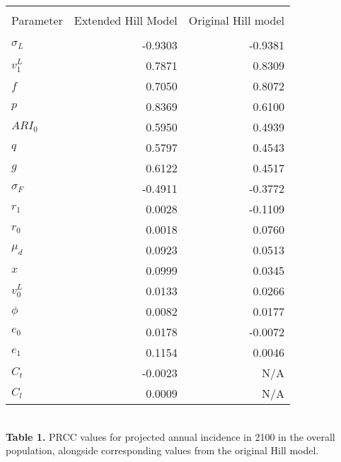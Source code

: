 \documentclass{article}[11pt]
\begin{document}
\begin{table}
\centering
\begin{tabular}{l r r}
\hline\hline\\
Parameter & Extended Hill Model & Original Hill model \\ [0.5ex]
\hline\\
$\sigma_{L}$  & -0.9303 & -0.9381 \\
$v^{L}_{1}$   & 0.7871  & 0.8309 \\
$f$                 & 0.7050  & 0.8072 \\
$p$                & 0.8369  & 0.6100 \\
$ARI_{0}$      & 0.5950  & 0.4939 \\
$q$                & 0.5797  & 0.4543 \\
$g$                & 0.6122  & 0.4517 \\
$\sigma_{F}$ & -0.4911 & -0.3772 \\
$r_{1}$          & 0.0028  & -0.1109 \\
$r_{0}$          & 0.0018  & 0.0760 \\
$\mu_{d}$      & 0.0923 & 0.0513 \\
$x$                 & 0.0999 & 0.0345 \\
$v^{L}_{0}$    & 0.0133 & 0.0266 \\
$\phi$             & 0.0082 & 0.0177 \\
$e_{0}$          & 0.0178 & -0.0072 \\
$e_{1}$          & 0.1154 & 0.0046 \\
$C_{t}$          & -0.0023 & N/A \\
$C_{l}$           & 0.0009 & N/A \\ [1ex]
\hline
\end{tabular}\\[1ex]

{\bf Table 1.} PRCC values for projected annual incidence in 2100
 in the overall population, alongside corresponding values from the
original Hill model.
\end{table}
\end{document}
